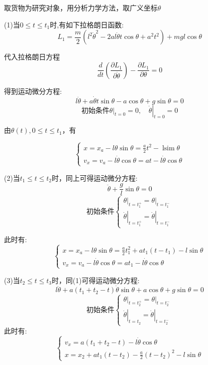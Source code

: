 \documentclass{cumcmthesis}
\begin{document}
取货物为研究对象，用分析力学方法，取广义坐标$\theta$

(1)当$0 \leq t \leq t_1$时,有如下拉格朗日函数:
$$L_{1}=\frac{m}{2}\left(l^{2} \dot{\theta}^{2}-2 a l \dot{\theta} t \cos \theta+a^{2} t^{2}\right)+m gl\cos \theta$$

代入拉格朗日方程$$\frac{d}{d t}\left(\frac{\partial L_{1}}{\partial \dot{\theta}}\right)-\frac{\partial L_1}{\partial \theta}=0$$

得到运动微分方程:$$l \ddot{\theta}+a \dot{\theta} t \sin \theta-a \cos \theta+g \sin \theta=0$$
$$\text{初始条件}\left.\theta\right|_{t=0}=0,\left.\quad \dot{\theta}\right|_{t=0}=0$$

由$\theta(t),0 \leqslant t \leqslant t_{1}$，有

$$\left\{\begin{array}{l}
        x=x_{a}-l \theta \sin \theta=\frac{a}{2} t^{2}-\operatorname{lsim} \theta \\
        v_{x}=v_{a}-l \dot{\theta} \cos \theta=a t-l \dot{\theta} \cos \theta
    \end{array}\right.$$

(2)当$t_1 \leq t \leq t_2$时，同上可得运动微分方程:
$$\ddot{\theta}+\frac{g}{l} \sin \theta=0$$
$$\text{初始条件}\left \{\begin{array}{l}
        \left.\theta\right|_{t=t_{1}^{+}}=\left.\theta\right|_{t=t_{1}^{-}} \\
        \left.\dot{\theta}\right|_{t=t_{1}^{+}}=\left.\dot{\theta}\right|_{t=t_{1}^{-}}
    \end{array}\right.$$

此时有:$$\left\{\begin{array}{l}
        x=x_{a}-l\theta \sin \theta=\frac{a}{2} t_{1}^{2}+at_1(t-t_1)-l\sin \theta \\
        v_{x}=v_{a}-l \dot{\theta} \cos \theta=a t_{1}-l\dot{\theta }\cos \theta
    \end{array}\right.$$

(3)当$t_2 \leq t \leq t_3$时，同(1)可得运动微分方程:
$$l \ddot{\theta}+a\left(t_{1}+t_{2}-t\right) \dot{\theta} \sin \theta+a \cos \theta+g \sin \theta=0$$
$$\text{初始条件}\left \{\begin{array}{l}
        \left.\theta\right|_{t=t_{2}^{+}}=\left.\theta\right|_{t=t_{2}^{-}} \\
        \left.\dot{\theta}\right|_{t=t_{2}}=\left.\dot{\theta}\right|_{t=t_{2}^{-}}
    \end{array}\right.$$
此时有:$$\left\{\begin{array}{l}
        v_{x}=a\left(t_{1}+t_{2}-t\right)-l \dot{ \theta} \cos \theta \\
        x=x_{2}+at_{1}(t-t_{2})-\frac{a}{2}(t-t_{2})^{2}-l\sin\theta
    \end{array}\right.$$
\end{document}
